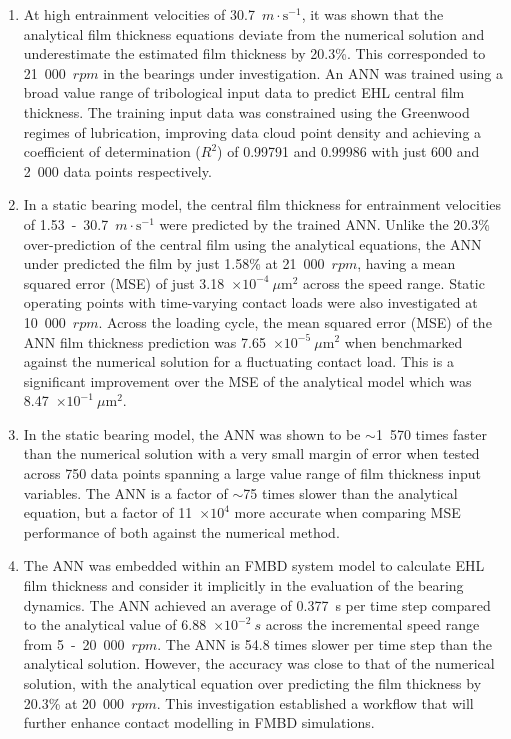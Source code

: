 \begin{enumerate}
	\item At high entrainment velocities of 30.7~$m \cdot \mathrm{s}^{-1}$, it was shown that the analytical film thickness equations deviate from the numerical solution and underestimate the estimated film thickness by 20.3\%. This corresponded to 21~000~$rpm$ in the bearings under investigation. An ANN was trained using a broad value range of tribological input data to predict EHL central film thickness. The training input data was constrained using the Greenwood regimes of lubrication, improving data cloud point density and achieving a coefficient of determination ($R^2$) of 0.99791 and 0.99986 with just 600 and 2~000 data points respectively.
	
	\item In a static bearing model, the central film thickness for entrainment velocities of 1.53~-~30.7~$m \cdot \mathrm{s}^{-1}$ were predicted by the trained ANN. Unlike the 20.3\% over-prediction of the central film using the analytical equations, the ANN under predicted the film by just 1.58\% at 21~000~$rpm$, having a mean squared error (MSE) of just 3.18~$\times 10^{-4}~\mu \mathrm{m}^2$ across the speed range. Static operating points with time-varying contact loads were also investigated at 10~000~$rpm$. Across the loading cycle, the mean squared error (MSE) of the ANN film thickness prediction was 7.65~$\times 10^{-5}~\mu \mathrm{m}^2$ when benchmarked against the numerical solution for a fluctuating contact load. This is a significant improvement over the MSE of the analytical model which was 8.47~$\times 10^{-1}~\mu\mathrm{m}^2$.
	
	\item In the static bearing model, the ANN was shown to be $\sim$1~570 times faster than the numerical solution with a very small margin of error when tested across 750 data points spanning a large value range of film thickness input variables. The ANN is a factor of $\sim$75 times slower than the analytical equation, but a factor of 11~$\times 10^{4}$ more accurate when comparing MSE performance of both against the numerical method.
	
	\item The ANN was embedded within an FMBD system model to calculate EHL film thickness and consider it implicitly in the evaluation of the bearing dynamics. The ANN achieved an average of 0.377~s per time step compared to the analytical value of 6.88~$\times 10^{-2}~s$ across the incremental speed range from 5~-~20~000~$rpm$. The ANN is 54.8 times slower per time step than the analytical solution. However, the accuracy was close to that of the numerical solution, with the analytical equation over predicting the film thickness by 20.3\% at 20~000~$rpm$. This investigation established a workflow that will further enhance contact modelling in FMBD simulations.
\end{enumerate}


